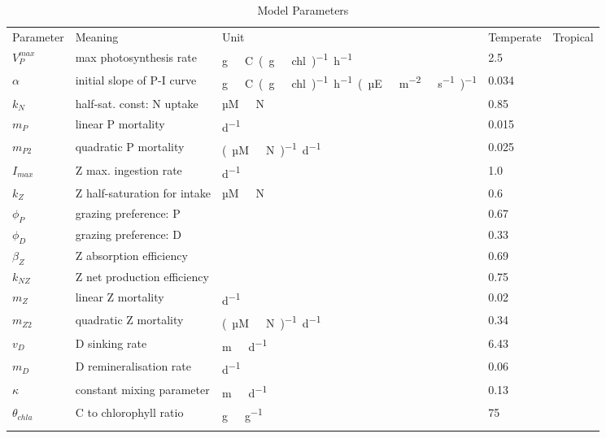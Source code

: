 \documentclass[template.tex]{subfiles}
\begin{document}
\begin{table*}[t]
\caption{Model Parameters}
\begin{tabular}{l l l l l}
Parameter & Meaning & Unit & Temperate & Tropical \\
\tophline
$V^{max}_P$ & max photosynthesis rate & \unit{g \ C (g \ chl)^{−1} h^{−1}} & 2.5  &  \\
$\alpha$ & initial slope of P-I curve & \unit{g \ C (g \ chl)^{−1} h^{−1} (µE \ m^{-2} \ s^{-1})^{-1}} & 0.034 & \\
$k_N$ & half-sat. const: N uptake & \unit{µM \ N} & 0.85 & \\
$m_P$ & linear P mortality & \unit{d^{−1}} & 0.015 & \\
$m_{P2}$ & quadratic P mortality & \unit{(µM \ N)^{-1} d^{−1}} & 0.025 & \\
$I_{max}$ & Z max. ingestion rate & \unit{d^{−1}} & 1.0 & \\
$k_Z$ & Z half-saturation for intake & \unit{µM \ N} & 0.6 & \\
$\phi_P$ & grazing preference: P & & 0.67 & \\
$\phi_D$ & grazing preference: D & & 0.33 & \\
$\beta_Z$ & Z absorption efficiency & & 0.69 & \\
$k_{NZ}$ & Z net production efficiency & & 0.75 &  \\
$m_Z$ & linear Z mortality  & \unit{d^{−1}} & 0.02 & \\
$m_{Z2}$ & quadratic Z mortality & \unit{(µM \ N)^{-1} d^{−1}} & 0.34 & \\
$v_D$ & D sinking rate & \unit{m \ d^{−1}} & 6.43 & \\
$m_D$ & D remineralisation rate & \unit{d^{−1}} & 0.06 & \\
$\kappa$ & constant mixing parameter & \unit{m \ d^{−1}} & 0.13 & \\
$\theta_{chla}$ & C to chlorophyll ratio & \unit{g \ g^{-1}} & 75 & \\
\middlehline

\bottomhline
\end{tabular}
\label{appendix:table:usecase1parameters}
\end{table*}
%


\clearpage

\biblio
\end{document}
